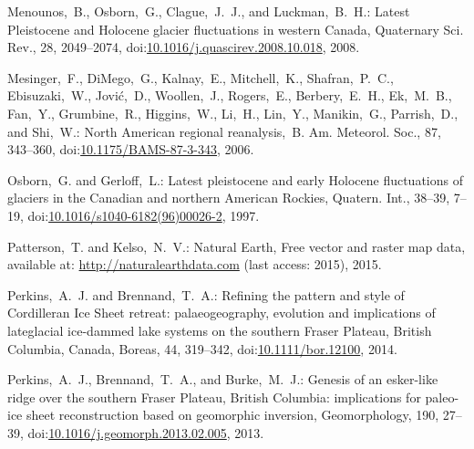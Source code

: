 \documentclass[tc, manuscript]{copernicus}
\begin{document}
\begin{thebibliography}{114}
Menounos,~B., Osborn,~G., Clague,~J.~J., and Luckman,~B.~H.: Latest Pleistocene and Holocene glacier fluctuations in western Canada, Quaternary Sci. Rev., 28, 2049--2074,
doi:\href{http://dx.doi.org/10.1016/j.quascirev.2008.10.018}{10.1016/j.quascirev.2008.10.018}, 2008.


Mesinger,~F., DiMego,~G., Kalnay,~E., Mitchell,~K., Shafran,~P.~C., Ebisuzaki,~W., Jovi\'{c},~D., Woollen,~J., Rogers,~E., Berbery,~E.~H., Ek,~M.~B., Fan,~Y., Grumbine,~R., Higgins,~W., Li,~H., Lin,~Y., Manikin,~G., Parrish,~D., and Shi,~W.: North American regional reanalysis,~B. Am. Meteorol. Soc., 87, 343--360,
doi:\href{http://dx.doi.org/10.1175/BAMS-87-3-343}{10.1175/BAMS-87-3-343}, 2006.


Osborn,~G. and Gerloff,~L.: Latest pleistocene and early Holocene fluctuations of glaciers in the Canadian and northern American Rockies, Quatern. Int., 38--39, 7--19,
doi:\href{http://dx.doi.org/10.1016/s1040-6182(96)00026-2}{10.1016/s1040-6182(96)00026-2}, 1997.


Patterson,~T. and Kelso,~N.~V.: {N}atural {E}arth, {F}ree vector and raster
map data, available at: \url{http://naturalearthdata.com} (last access:
2015), 2015.


Perkins,~A.~J. and Brennand,~T.~A.: Refining the pattern and style of Cordilleran Ice Sheet retreat: palaeogeography, evolution and implications of lateglacial ice-dammed lake systems on the southern Fraser Plateau, British Columbia, Canada, Boreas, 44, 319--342,
doi:\href{http://dx.doi.org/10.1111/bor.12100}{10.1111/bor.12100}, 2014.


Perkins,~A.~J., Brennand,~T.~A., and Burke,~M.~J.: Genesis of an esker-like ridge over the southern Fraser Plateau, British Columbia: implications for paleo-ice sheet reconstruction based on geomorphic inversion, Geomorphology, 190, 27--39,
doi:\href{http://dx.doi.org/10.1016/j.geomorph.2013.02.005}{10.1016/j.geomorph.2013.02.005}, 2013.



\end{thebibliography}
\end{document}
